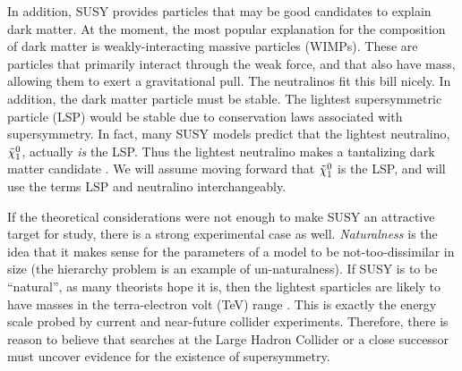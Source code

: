In addition, SUSY provides particles that may be good candidates to
explain dark matter. At the moment, the most popular explanation for
the composition of dark matter is weakly-interacting massive particles
(WIMPs). These are particles that primarily interact through the weak
force, and that also have mass, allowing them to exert a gravitational
pull. The neutralinos fit this bill nicely. In addition, the dark
matter particle must be stable. The lightest supersymmetric particle
(LSP) would be stable due to conservation laws associated
with supersymmetry. In fact, many SUSY models predict that the lightest
neutralino, $\tilde{\chi}^0_1$, actually \emph{is} the LSP. Thus the lightest
neutralino makes a tantalizing dark matter candidate
\cite{susydarkmatter,susyprimer}. We will assume moving forward
that $\tilde{\chi}^0_1$ is the LSP, and will use the terms LSP and neutralino
interchangeably.

If the theoretical considerations were not enough to make SUSY an
attractive target for study, there is a strong experimental case as
well. \emph{Naturalness} is the idea that it makes sense for the
parameters of a model to be not-too-dissimilar in size (the hierarchy
problem is an example of un-naturalness). If SUSY is
to be ``natural'', as many theorists hope it is, then the lightest
sparticles are likely to have masses in the terra-electron volt (TeV)
range \cite{susydarkmatter,susyprimer}. This is exactly the energy
scale probed by current and near-future collider experiments.
Therefore, there is reason to believe that searches at the Large Hadron
Collider or a close successor must uncover evidence for the existence
of supersymmetry.
